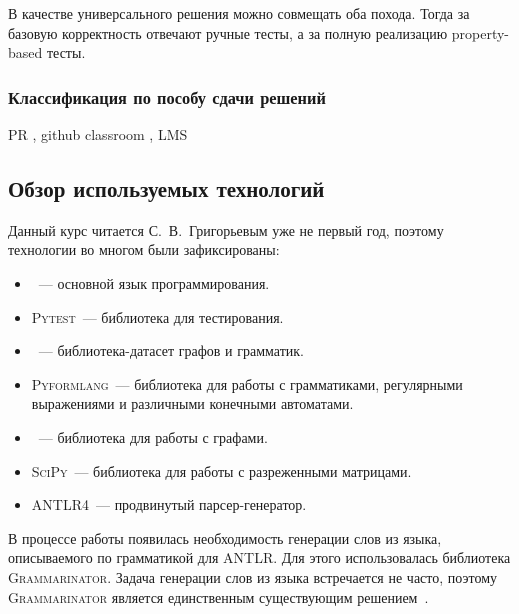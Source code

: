 В качестве универсального решения можно совмещать оба похода.
Тогда за базовую корректность отвечают ручные тесты, а за полную реализацию property-based тесты.

\subsubsection{Классификация по пособу сдачи решений}

PR , github classroom , LMS 


\subsection{Обзор используемых технологий}

Данный курс читается С.~В.~Григорьевым уже не первый год, поэтому технологии во многом были зафиксированы:
\begin{itemize}
    \item \python{}~--- основной язык программирования.
    \item \textsc{Pytest}~--- библиотека для тестирования.
    \item \cfpqdata{}~--- библиотека-датасет графов и грамматик.
    \item \textsc{Pyformlang}~--- библиотека для работы с грамматиками, регулярными выражениями и различными конечными автоматами.
    \item \networkx{}~--- библиотека для работы с графами.
    \item \textsc{SciPy}~--- библиотека для работы с разреженными матрицами.
    \item \textsc{ANTLR4}~--- продвинутый парсер-генератор.
\end{itemize}


В процессе работы появилась необходимость генерации слов из языка, описываемого по грамматикой для ANTLR.
Для этого использовалась библиотека \textsc{Grammarinator}.
Задача генерации слов из языка встречается не часто, поэтому \textsc{Grammarinator} является единственным существующим решением~\cite{GeneratingGrammarconformantTexts}.
